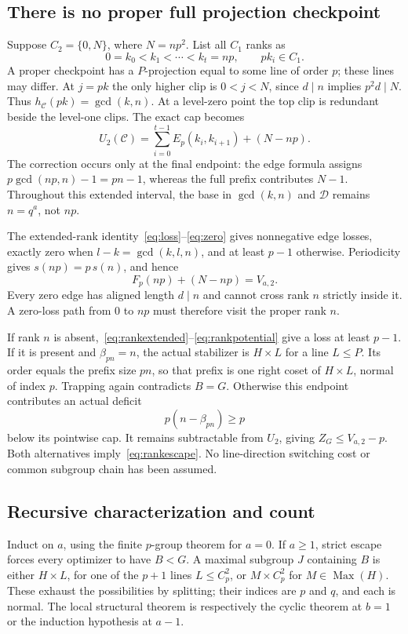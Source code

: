\documentclass[11pt,letterpaper]{article}
\theoremstyle{definition}\newtheorem{definition}{Definition}
\newcommand{\Max}{\operatorname{Max}}
\newcommand{\D}{\mathcal D}
\newcommand{\C}{\mathcal C}
\begin{document}
\subsection{There is no proper full projection checkpoint}
Suppose $C_2=\{0,N\}$, where $N=np^2$. List all $C_1$ ranks as
\[
0=k_0<k_1<\cdots<k_t=np,\qquad pk_i\in C_1.
\]
A proper checkpoint has a $P$-projection equal to some line of order $p$; these lines may differ. At $j=pk$ the only higher clip is $0<j<N$, since $d\mid n$ implies $p^2d\mid N$. Thus $h_{\C}(pk)=\gcd(k,n)$. At a level-zero point the top clip is redundant beside the level-one clips. The exact cap becomes
\begin{equation}
U_2(\C)=\sum_{i=0}^{t-1}E_p(k_i,k_{i+1})+(N-np).\label{eq:rankextended}
\end{equation}
The correction occurs only at the final endpoint: the edge formula assigns $p\gcd(np,n)-1=pn-1$, whereas the full prefix contributes $N-1$. Throughout this extended interval, the base in $\gcd(k,n)$ and $\D$ remains $n=q^a$, not $np$.

The extended-rank identity~\eqref{eq:loss}--\eqref{eq:zero} gives nonnegative edge losses, exactly zero when $l-k=\gcd(k,l,n)$, and at least $p-1$ otherwise. Periodicity gives $s(np)=p\,s(n)$, and hence
\begin{equation}
F_p(np)+(N-np)=V_{a,2}.\label{eq:rankpotential}
\end{equation}
Every zero edge has aligned length $d\mid n$ and cannot cross rank $n$ strictly inside it. A zero-loss path from $0$ to $np$ must therefore visit the proper rank $n$.

If rank $n$ is absent,~\eqref{eq:rankextended}--\eqref{eq:rankpotential} give a loss at least $p-1$. If it is present and $\beta_{pn}=n$, the actual stabilizer is $H\times L$ for a line $L\le P$. Its order equals the prefix size $pn$, so that prefix is one right coset of $H\times L$, normal of index $p$. Trapping again contradicts $B=G$. Otherwise this endpoint contributes an actual deficit
\[
p(n-\beta_{pn})\ge p
\]
below its pointwise cap. It remains subtractable from $U_2$, giving $Z_G\le V_{a,2}-p$. Both alternatives imply~\eqref{eq:rankescape}. No line-direction switching cost or common subgroup chain has been assumed.

\subsection{Recursive characterization and count}
Induct on $a$, using the finite $p$-group theorem for $a=0$. If $a\ge1$, strict escape forces every optimizer to have $B<G$. A maximal subgroup $J$ containing $B$ is either $H\times L$, for one of the $p+1$ lines $L\le C_p^2$, or $M\times C_p^2$ for $M\in\Max(H)$. These exhaust the possibilities by splitting; their indices are $p$ and $q$, and each is normal. The local structural theorem is respectively the cyclic theorem at $b=1$ or the induction hypothesis at $a-1$.
\end{document}
